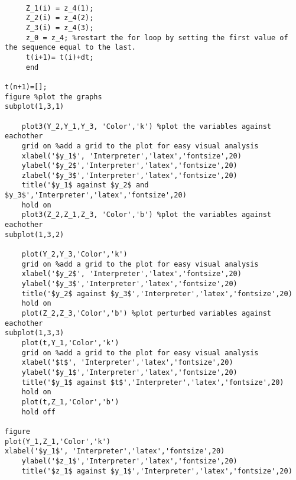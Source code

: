 \documentclass[a4paper,11pt]{article}
\begin{document}
\begin{lstlisting}[style=matlab-editor]
     
     Z_1(i) = z_4(1);
     Z_2(i) = z_4(2);
     Z_3(i) = z_4(3);
     z_0 = z_4; %restart the for loop by setting the first value of the sequence equal to the last.
     t(i+1)= t(i)+dt;
     end

t(n+1)=[];
figure %plot the graphs
subplot(1,3,1)
   
    plot3(Y_2,Y_1,Y_3, 'Color','k') %plot the variables against eachother
    grid on %add a grid to the plot for easy visual analysis
    xlabel('$y_1$', 'Interpreter','latex','fontsize',20)
    ylabel('$y_2$','Interpreter','latex','fontsize',20)
    zlabel('$y_3$','Interpreter','latex','fontsize',20)
    title('$y_1$ against $y_2$ and $y_3$','Interpreter','latex','fontsize',20)
    hold on
    plot3(Z_2,Z_1,Z_3, 'Color','b') %plot the variables against eachother
subplot(1,3,2)    
    
    plot(Y_2,Y_3,'Color','k')
    grid on %add a grid to the plot for easy visual analysis
    xlabel('$y_2$', 'Interpreter','latex','fontsize',20)
    ylabel('$y_3$','Interpreter','latex','fontsize',20)
    title('$y_2$ against $y_3$','Interpreter','latex','fontsize',20)
    hold on
    plot(Z_2,Z_3,'Color','b') %plot perturbed variables against eachother
subplot(1,3,3)     
    plot(t,Y_1,'Color','k')
    grid on %add a grid to the plot for easy visual analysis
    xlabel('$t$', 'Interpreter','latex','fontsize',20)
    ylabel('$y_1$','Interpreter','latex','fontsize',20)
    title('$y_1$ against $t$','Interpreter','latex','fontsize',20)
    hold on
    plot(t,Z_1,'Color','b')
    hold off

figure
plot(Y_1,Z_1,'Color','k')
xlabel('$y_1$', 'Interpreter','latex','fontsize',20)
    ylabel('$z_1$','Interpreter','latex','fontsize',20)
    title('$z_1$ against $y_1$','Interpreter','latex','fontsize',20)


\end{lstlisting}
\end{document}
